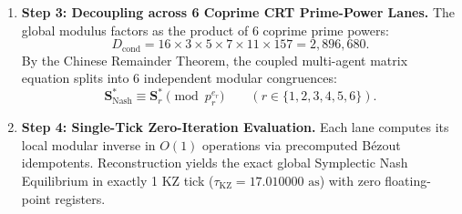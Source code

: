 \documentclass[11pt,onecolumn]{article}
\begin{document}
\begin{enumerate}
\begin{equation}
    \end{equation}
    the multi-agent quadratic game linearizes over the commutative Lie algebra $\mathfrak{u}_P \cong \text{Sym}_g(\mathbb{Z}/D_{\text{cond}}\mathbb{Z})$.
    \item \textbf{Step 3: Decoupling across 6 Coprime CRT Prime-Power Lanes.} The global modulus factors as the product of 6 coprime prime powers:
    \begin{equation}
    D_{\text{cond}} = 16 \times 3 \times 5 \times 7 \times 11 \times 157 = 2{,}896{,}680.
    \end{equation}
    By the Chinese Remainder Theorem, the coupled multi-agent matrix equation splits into 6 independent modular congruences:
    \begin{equation}
    \mathbf{S}_{\text{Nash}}^* \equiv \mathbf{S}_r^* \pmod{p_r^{e_r}} \qquad (r \in \{1, 2, 3, 4, 5, 6\}).
    \label{eq:v8_54}
    \end{equation}
    \item \textbf{Step 4: Single-Tick Zero-Iteration Evaluation.} Each lane computes its local modular inverse in $O(1)$ operations via precomputed B\'ezout idempotents. Reconstruction yields the exact global Symplectic Nash Equilibrium in exactly 1 KZ tick ($\tau_{\text{KZ}} = 17.010000\text{ as}$) with zero floating-point registers.
\end{enumerate}

\FloatBarrier
\begin{table}[!htbp]
\centering\small
\caption{6-Lane CRT Decomposition and Multi-Deity Nash Resolver Profile (\texttt{THM-DARK-V8-12}).}
\label{tab:v8_100_crt_lanes}
\end{table}
\FloatBarrier
\end{document}
